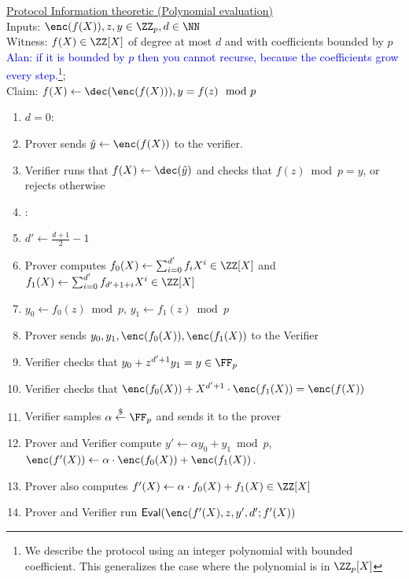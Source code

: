 \documentclass{article}
\theoremstyle{definition}
\begin{document}
\begin{small}
 \begin{minipage}{1.1\textwidth}
\begin{mdframed}[userdefinedwidth=1\textwidth]  \label{prot:Opening}
	\noindent \underline{\textsf{Protocol \eval{} Information theoretic} (Polynomial evaluation)}\\
Inputs: $\enc(f(X)),z,y\in \ZZ_p,d \in \NN $\\
Witness: $f(X) \in \ZZ[X]$ of degree at most $d$ and with coefficients bounded by $p$ \textcolor{blue}{Alan: if it is bounded by $p$ then you cannot recurse, because the coefficients grow every step.}\footnote{We describe the protocol using an integer polynomial with bounded coefficient. This generalizes the case where the polynomial is in $\ZZ_p[X]$};\\ 
Claim: $f(X)\gets \dec(\enc(f(X))), y=f(z) \mod p$

\begin{enumerate}[nolistsep]
\item \pcif $d=0$:
\item \pcind[1] Prover sends $\hat{y}\gets \enc(f(X))$ to the verifier. 
\item \pcind[1] Verifier runs that $f(X)\gets \dec(\hat{y})$ and checks that  $f(z) \bmod p=y$, or rejects otherwise 
\item \pcelse: 
\item \pcind[1] $d'\gets \frac{d+1}{2}-1$
\item \pcind[1] Prover computes $f_0(X)\gets\sum_{i=0}^{d'} f_i X^i\in \ZZ[X]$ and $f_1(X)\gets\sum_{i=0}^{d'} f_{d'+1+i} X^{i}\in \ZZ[X]$
\item \pcind[1] $y_0\gets f_0(z) \bmod p$, $y_1\gets f_1(z)\bmod p$
\item \pcind[1] Prover sends $y_0,y_1, \enc(f_0(X)),\enc(f_1(X))$ to the Verifier
\item \pcind[1] Verifier checks that $y_0+z^{d'+1} y_1=y\in \FF_p$ 
\item \pcind[1] Verifier checks that $\enc(f_0(X))+X^{d'+1}\cdot \enc(f_1(X))=\enc(f(X))$
\item \pcind[1] Verifier samples $\alpha \sample \FF_p$ and sends it to the prover
\item \pcind[1] Prover and Verifier compute $y'\gets\alpha y_0 +y_1 \bmod p$, $\enc(f'(X))\gets \alpha \cdot \enc(f_0(X)) +\enc(f_1(X))$. 
\item \pcind[1] Prover also computes $f'(X)\gets\alpha  \cdot f_0(X)+f_1(X) \in \ZZ[X]$ 
\item \pcind[1] Prover and Verifier run $\eval(\enc(f'(X),z,y',d';f'(X))$
\end{enumerate}
\end{mdframed}
\end{minipage}
\end{small}
\end{document}
